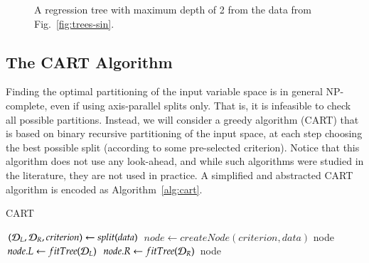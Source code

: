 \begin{figure}[htbp]
\label{fig:fig:trees-sin-2}
\caption{A regression tree with maximum depth of 2 from the data from Fig.~\ref{fig:trees-sin}.}
\end{figure}

\subsection*{The CART Algorithm}

Finding the optimal partitioning of the input variable space is in general NP-complete, even if using axis-parallel splits only. That is, it is infeasible to check all possible partitions. Instead, we will consider a greedy algorithm (CART) that is based on binary recursive partitioning of the input space, at each step choosing the best possible split (according to some pre-selected criterion). Notice that this algorithm does not use any look-ahead, and while such algorithms were studied in the literature, they are not used in practice. A simplified and abstracted CART algorithm is encoded as Algorithm~\ref{alg:cart}.

\begin{algorithm}
\caption{CART}\label{alg:cart}
\begin{algorithmic}[1]
\State $(\mathcal{D}_L, \mathcal{D}_R, criterion) \gets split(data)$
\State $node \gets createNode(criterion, data)$
 \Return node \EndIf
\State $node.L \gets fitTree(\mathcal{D}_L)$
\State $node.R \gets fitTree(\mathcal{D}_R)$
\State \Return node
\EndProcedure
\end{algorithmic}
\end{algorithm}

